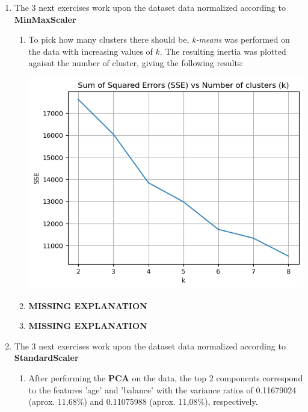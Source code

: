 \documentclass[12pt]{article}
\begin{document}
\begin{enumerate}[leftmargin=0pt, label=\textbf{\arabic*.)},start=1]
    \item The 3 next exercises work upon the dataset data normalized according to \textbf{MinMaxScaler}
          \begin{enumerate}[leftmargin=0pt, label=\textbf{\alph*.)}]
              \item To pick how many clusters there should be, \textit{k-means} was performed on the data with increasing values of $k$. The resulting inertia was plotted agaisnt the number of cluster, giving the following results:

                    \begin{center}
                        \includegraphics{sse_vs_k.png}
                    \end{center}

              \item \textbf{MISSING EXPLANATION}
              \item \textbf{MISSING EXPLANATION}
          \end{enumerate}
    \item The 3 next exercises work upon the dataset data normalized according to \textbf{StandardScaler}
          \begin{enumerate}[leftmargin=0pt, label=\textbf{\alph*.)}]
              \item After performing the \textbf{PCA} on the data, the top 2 components correspond to the features 'age' and 'balance' with the variance ratios of 0.11679024 (aprox. 11,68\%) and 0.11075988 (aprox. 11,08\%), respectively.


\end{enumerate}
\end{enumerate}
\end{document}
